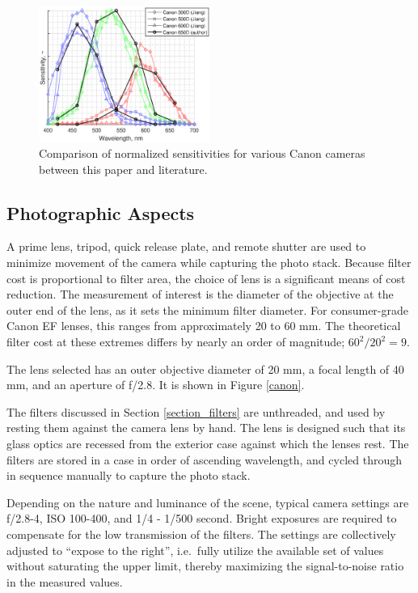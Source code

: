 \documentclass[twocolumn,10pt]{asme2ej}
\newcommand{\id}{\hspace{6 mm}}
\begin{document}
\begin{figure}
\centering
\includegraphics[width=0.5\textwidth]{camera_spectral_sensitivities.eps}
\caption{Comparison of normalized sensitivities for various Canon cameras between this paper and literature. \cite{Jiang}}
\label{camera_spectral_sensitivities}
\end{figure}

\subsection{Photographic Aspects}
\label{photographic}

A prime lens, tripod, quick release plate, and remote shutter are used to minimize movement of the camera while capturing the photo stack. Because filter cost is proportional to filter area, the choice of lens is a significant means of cost reduction. The measurement of interest is the diameter of the objective at the outer end of the lens, as it sets the minimum filter diameter. For consumer-grade Canon EF lenses, this ranges from approximately 20 to 60 mm. The theoretical filter cost at these extremes differs by nearly an order of magnitude; $60^2 / 20^2 = 9$.

\id The lens selected has an outer objective diameter of 20 mm, a focal length of 40 mm, and an aperture of f/2.8. It is shown in Figure \ref{canon}.

\id The filters discussed in Section \ref{section_filters} are unthreaded, and used by resting them against the camera lens by hand. The lens is designed such that its glass optics are recessed from the exterior case against which the lenses rest. The filters are stored in a case in order of ascending wavelength, and cycled through in sequence manually to capture the photo stack.

\id Depending on the nature and luminance of the scene, typical camera settings are f/2.8-4, ISO 100-400, and 1/4 - 1/500 second. Bright exposures are required to compensate for the low transmission of the filters. The settings are collectively adjusted to ``expose to the right'', i.e.\ fully utilize the available set of values without saturating the upper limit, thereby maximizing the signal-to-noise ratio in the measured values.
\end{document}
